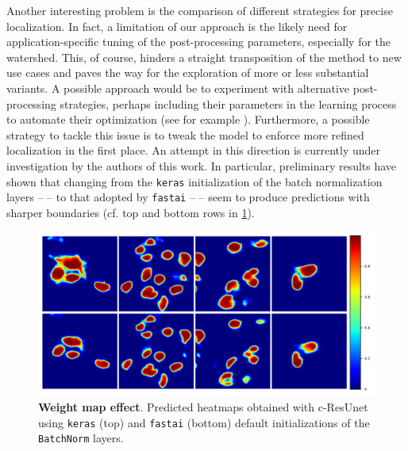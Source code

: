 Another interesting problem is the comparison of different strategies for precise localization. In fact, a limitation of our approach is the likely need for application-specific tuning of the post-processing parameters, especially for the watershed.
This, of course, hinders a straight transposition of the method to new use cases and paves the way for the exploration of more or less substantial variants.
A possible approach would be to experiment with alternative post-processing strategies, perhaps including their parameters in the learning process to automate their optimization (see for example ).
Furthermore, a possible strategy to tackle this issue is to tweak the model to enforce more refined localization in the first place.
An attempt in this direction is currently under investigation by the authors of this work.
In particular, preliminary results have shown that changing from the \texttt{keras} initialization of the batch normalization layers --  -- to that adopted by \texttt{fastai} --  -- seem to produce predictions with sharper boundaries (cf. top and bottom rows in \cref{fig:kerasVSfastai_bathnorm}).
\begin{figure}
\centering
\includegraphics[width=\textwidth]{figures/610_future_works/Tc-ResUnetVSBbatchnorm_effect.pdf}
\caption{\textbf{Weight map effect}. 
Predicted heatmaps obtained with c-ResUnet using \texttt{keras} (top) and \texttt{fastai} (bottom) default initializations of the \texttt{BatchNorm} layers.} 
\label{fig:kerasVSfastai_bathnorm}
\end{figure}

